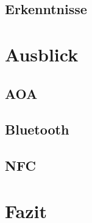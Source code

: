 \documentclass[12pt,journal,compsoc]{IEEEtran}
\begin{document}
\subsection{Erkenntnisse}





\section{Ausblick}
\subsection{AOA}

\subsection{Bluetooth}

\subsection{NFC}
\section{Fazit}









\nocite{*}
\end{document}
